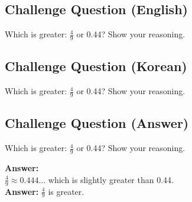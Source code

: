 \cleardoublepage
\subsection*{Challenge Question (English)}
Which is greater: $\frac{4}{9}$ or 0.44? Show your reasoning.


\newpage
\subsection*{Challenge Question (Korean)}
Which is greater: $\frac{4}{9}$ or 0.44? Show your reasoning.


\newpage
\subsection*{Challenge Question (Answer)}
Which is greater: $\frac{4}{9}$ or 0.44? Show your reasoning.

\textbf{Answer:}\\
$\frac{4}{9} \approx 0.444...$ which is slightly greater than 0.44.\\
\textbf{Answer:} $\frac{4}{9}$ is greater.
